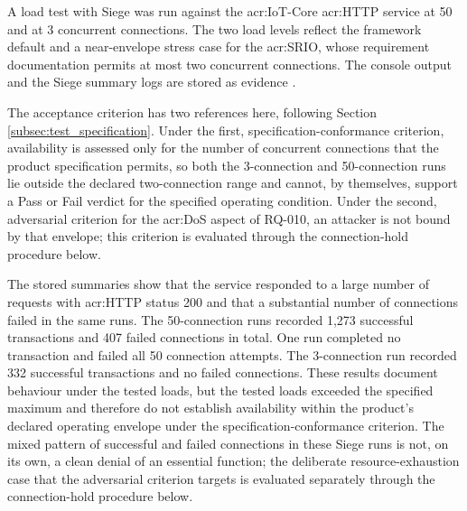 A load test with Siege was run against the \gls{acr:IoT}-Core \gls{acr:HTTP} service at 50 and at 3 concurrent connections. The two load levels reflect the framework default and a near-envelope stress case for the \gls{acr:SRIO}, whose requirement documentation permits at most two concurrent connections. The console output and the Siege summary logs are stored as evidence \cite{joedog-siege}.

The acceptance criterion has two references here, following Section \ref{subsec:test_specification}. Under the first, specification-conformance criterion, availability is assessed only for the number of concurrent connections that the product specification permits, so both the 3-connection and 50-connection runs lie outside the declared two-connection range and cannot, by themselves, support a Pass or Fail verdict for the specified operating condition. Under the second, adversarial criterion for the \gls{acr:DoS} aspect of RQ-010, an attacker is not bound by that envelope; this criterion is evaluated through the connection-hold procedure below.

The stored summaries show that the service responded to a large number of requests with \gls{acr:HTTP} status 200 and that a substantial number of connections failed in the same runs. The 50-connection runs recorded 1,273 successful transactions and 407 failed connections in total. One run completed no transaction and failed all 50 connection attempts. The 3-connection run recorded 332 successful transactions and no failed connections. These results document behaviour under the tested loads, but the tested loads exceeded the specified maximum and therefore do not establish availability within the product's declared operating envelope under the specification-conformance criterion. The mixed pattern of successful and failed connections in these Siege runs is not, on its own, a clean denial of an essential function; the deliberate resource-exhaustion case that the adversarial criterion targets is evaluated separately through the connection-hold procedure below.


